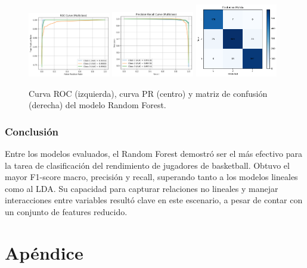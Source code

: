 \documentclass[11pt]{article}
\begin{document}
\begin{figure}[H]
    \centering
    \includegraphics[width=0.32\textwidth]{figures/rf_roc.png}
    \hfill
    \includegraphics[width=0.32\textwidth]{figures/rf_pr.png}
    \hfill
    \includegraphics[width=0.32\textwidth]{figures/rf_conf_matrix.png}
    \caption{Curva ROC (izquierda), curva PR (centro) y matriz de confusión (derecha) del modelo Random Forest.}
    \label{fig:rf_figures}
\end{figure}

\subsubsection*{Conclusión}

Entre los modelos evaluados, el Random Forest demostró ser el más efectivo para la tarea de clasificación del rendimiento de jugadores de basketball. Obtuvo el mayor F1-score macro, precisión y recall, superando tanto a los modelos lineales como al LDA. Su capacidad para capturar relaciones no lineales y manejar interacciones entre variables resultó clave en este escenario, a pesar de contar con un conjunto de features reducido.





\appendix
\section{Apéndice}
\end{document}
